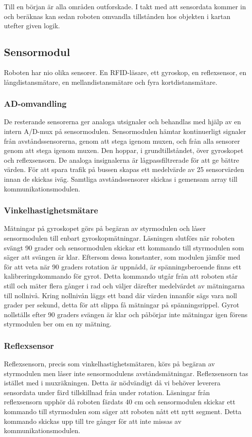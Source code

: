\documentclass[a4paper,12pt,fleqn]{article}
\begin{document}
Till en början är alla områden outforskade. I takt med att sensordata kommer in och beräknas kan sedan roboten omvandla tillstånden hos objekten i kartan utefter given logik. 

\subsection{Sensormodul}

Roboten har nio olika sensorer. En RFID-läsare, ett gyroskop, en reflexsensor, en långdistansmätare, en mellandistansmätare och fyra kortdistansmätare. 

\subsubsection{AD-omvandling}
De resterande sensorerna ger analoga utsignaler och behandlas med hjälp av en intern A/D-mux på sensormodulen. 
Sensormodulen hämtar kontinuerligt signaler från avståndssensorerna, genom att stega igenom muxen, och från alla sensorer genom att stega igenom muxen. Den hoppar, i grundtillståndet, över gyroskopet och reflexsensorn. De analoga insignalerna är lågpassfiltrerade för att ge bättre värden.
För att spara trafik på bussen skapas ett medelvärde av 25 sensorvärden innan de skickas iväg. Samtliga avståndssensorer skickas i gemensam array till kommunikationsmodulen.


\subsubsection{Vinkelhastighetsmätare}
Mätningar på gyroskopet görs på begäran av styrmodulen och låser sensormodulen till enbart gyroskopmätningar. 
Läsningen slutförs när roboten svängt 90 grader och sensormodulen skickar ett kommando till styrmodulen som säger att svängen är klar. Eftersom dessa konstanter, som modulen jämför med för att veta när 90 graders rotation är uppnådd, är spänningsberoende finns ett kalibreringskommando för gyrot. Detta kommando utgår från att roboten står still och mäter flera gånger i rad och väljer därefter medelvärdet av mätningarna till nollnivå. Kring nollnivån läggs ett band där värden innanför sägs vara noll grader per sekund, detta för att slippa få mätningar på spänningsrippel. Gyrot nollställs efter 90 graders svängen är klar och påbörjar inte mätningar igen förens styrmodulen ber om en ny mätning.

\subsubsection{Reflexsensor}
Reflexsensorn, precis som vinkelhastighetsmätaren, körs på begäran av styrmodulen men låser inte sensormodulens avståndsmätningar. Reflexsensorn tas istället med i muxräkningen. Detta är nödvändigt då vi behöver leverera sensordata under färd tillskillnad från under rotation. Läsningar från reflexsensorn upphör då roboten färdats $40$ cm och sensormodulen skickar ett kommando till styrmodulen
som säger att roboten nått ett nytt segment. Detta kommando skickas upp till tre gånger för att inte missas av kommunikationsmodulen.
\end{document}
